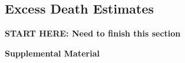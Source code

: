 \documentclass[11pt]{article}
\begin{document}
\subsection{Excess Death Estimates}
\textbf{START HERE: Need to finish this section}
 
\newpage



\newpage
\begin{center}
\LARGE{\textbf{Supplemental Material}}
\end{center}
\end{document}
